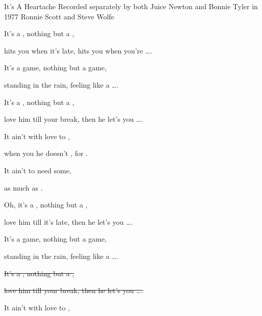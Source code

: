 \begin{SBSong}{It's A Heartache}
  {Recorded separately by both Juice Newton and Bonnie Tyler in 1977}
  {Ronnie Scott and Steve Wolfe}
  \begin{SBVerse}
    It's a , nothing but a ,

    hits you when it's  late, hits you when you're \ldots{}.

    It's a  game, nothing but a  game,

    standing in the  rain, feeling like a \ldots{}.
  \end{SBVerse}
  \WBPageBrk
  \begin{SBVerse}
    It's a , nothing but a ,

    love him till your  break, then he let's you \ldots{}.

    It ain't  with love to , 

    when you  he doesn't , for .
        
    It ain't  to need some, 

    as much as   \quad {}.
  \end{SBVerse}
  \begin{SBVerse}
    Oh, it's a , nothing but a ,

    love him till it's  late, then he let's you \ldots{}.

    It's a  game, nothing but a  game,

    standing in the  rain, feeling like a \ldots{}.
  \end{SBVerse}
  \begin{SBVerse}
  
    \sout{It's a , nothing but a ,}

    \sout{love him till your  break, then he let's you \ldots{}.}

    It ain't  with love to , 


\end{SBVerse}
\end{SBSong}
